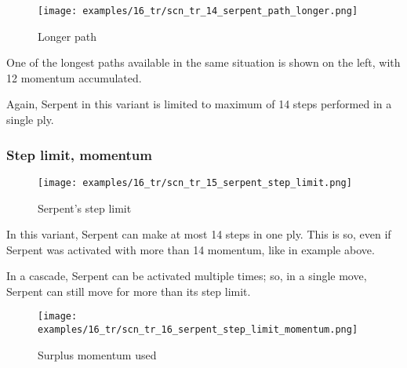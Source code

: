 
\vspace*{5.7\baselineskip}
\noindent
\begin{wrapfigure}[7]{l}{0.4\textwidth}
\centering
\texttt{[image: examples/16\_tr/scn\_tr\_14\_serpent\_path\_longer.png]}
\vspace*{-0.5\baselineskip}
\caption{Longer path}
\label{fig:scn_tr_14_serpent_path_longer}
\end{wrapfigure}
One of the longest paths available in the same situation is shown on the left,
with 12 momentum accumulated.

Again, Serpent in this variant is limited to maximum of 14 steps performed in a
single ply.

\clearpage %

\subsubsection*{Step limit, momentum}
\label{sec:Tamoanchan Revisited/Serpent/Movement/Step limit, momentum}

\vspace*{-1.2\baselineskip}
\noindent
\begin{figure}[!h]
\texttt{[image: examples/16\_tr/scn\_tr\_15\_serpent\_step\_limit.png]}
\caption{Serpent's step limit}
\label{fig:scn_tr_15_serpent_step_limit}
\end{figure}

In this variant, Serpent can make at most 14 steps in one ply. This is so,
even if Serpent was activated with more than 14 momentum, like in example
above.

In a cascade, Serpent can be activated multiple times; so, in a single move,
Serpent can still move for more than its step limit.

\clearpage %

\vspace*{-2.1\baselineskip}
\noindent
\begin{figure}[!h]
\texttt{[image: examples/16\_tr/scn\_tr\_16\_serpent\_step\_limit\_momentum.png]}
\caption{Surplus momentum used}
\label{fig:scn_tr_16_serpent_step_limit_momentum}
\end{figure}

